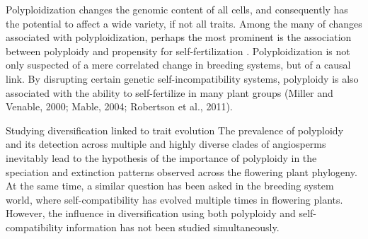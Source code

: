 Polyploidization changes the genomic content of all cells, and consequently has the potential to affect a wide variety, if not all traits. 
Among the many of changes associated with polyploidization, perhaps the most prominent is the association between polyploidy and propensity for self-fertilization \citep{stebbins_1950, grant_1956, barrett_1988}.
Polyploidization is not only suspected of a mere correlated change in breeding systems, but of a causal link.
By disrupting certain genetic self-incompatibility systems, polyploidy is also associated with the ability to self-fertilize in many plant groups (Miller and Venable, 2000; Mable, 2004; Robertson et al., 2011).
%



Studying diversification linked to trait evolution\newline
The prevalence of polyploidy and its detection across multiple and highly diverse clades of angiosperms inevitably lead to the hypothesis of the importance of polyploidy in the speciation and extinction patterns observed across the flowering plant phylogeny. 
At the same time, a similar question has been asked in the breeding system world, where self-compatibility has evolved multiple times in flowering plants. 
However, the influence in diversification using both polyploidy and self-compatibility information has not been studied simultaneously.


